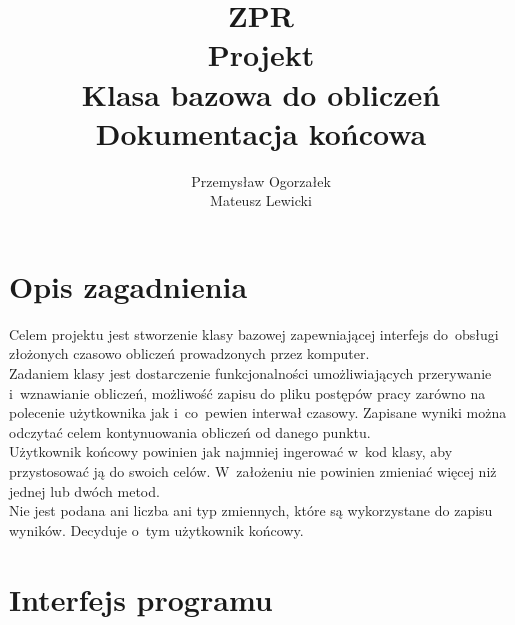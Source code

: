 \documentclass[a4paper]{article}
\author{Przemysław Ogorzałek\\Mateusz Lewicki}
\title{ZPR\\Projekt\\Klasa bazowa do obliczeń\\Dokumentacja końcowa}
\begin{document}
\maketitle
\section{Opis zagadnienia}
Celem projektu jest stworzenie klasy bazowej zapewniającej interfejs do~obsługi złożonych czasowo obliczeń prowadzonych przez komputer.\\
Zadaniem klasy jest dostarczenie funkcjonalności umożliwiających przerywanie i~wznawianie obliczeń, możliwość zapisu do pliku postępów pracy zarówno na polecenie użytkownika jak i~co~pewien interwał czasowy. 
Zapisane wyniki można odczytać celem kontynuowania obliczeń od danego punktu.\\
Użytkownik końcowy powinien jak najmniej ingerować w~kod klasy, aby przystosować ją do swoich celów.
W~założeniu nie powinien zmieniać więcej niż jednej lub dwóch metod.\\
Nie jest podana ani liczba ani typ zmiennych, które są wykorzystane do zapisu wyników.
Decyduje o~tym użytkownik końcowy.
\section{Interfejs programu}
\end{document}
